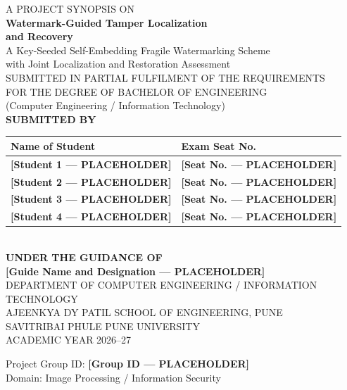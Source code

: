 \documentclass[12pt,a4paper]{article}
\newcommand{\PH}[1]{\textbf{[#1 --- PLACEHOLDER]}}
\begin{document}
\begin{titlepage}
\centering
\singlespacing
\vspace*{0.15in}

{\large A PROJECT SYNOPSIS ON}\\[0.22in]

{\LARGE\bfseries Watermark-Guided Tamper Localization\\[0.08in] and Recovery}\\[0.16in]

{\normalsize A Key-Seeded Self-Embedding Fragile Watermarking Scheme\\
with Joint Localization and Restoration Assessment}\\[0.28in]

{\normalsize SUBMITTED IN PARTIAL FULFILMENT OF THE REQUIREMENTS\\
FOR THE DEGREE OF BACHELOR OF ENGINEERING}\\[0.06in]
{\normalsize (Computer Engineering / Information Technology)}\\[0.28in]

{\large\bfseries SUBMITTED BY}\\[0.12in]

{\small
\begin{tabular}{@{}p{2.7in}p{1.9in}@{}}
\toprule
\textbf{Name of Student} & \textbf{Exam Seat No.} \\
\midrule
\PH{Student 1} & \PH{Seat No.} \\[0.12in]
\PH{Student 2} & \PH{Seat No.} \\[0.12in]
\PH{Student 3} & \PH{Seat No.} \\[0.12in]
\PH{Student 4} & \PH{Seat No.} \\
\bottomrule
\end{tabular}}\\[0.28in]

{\large\bfseries UNDER THE GUIDANCE OF}\\[0.1in]
{\normalsize \PH{Guide Name and Designation}}\\[0.28in]

{\normalsize DEPARTMENT OF COMPUTER ENGINEERING / INFORMATION TECHNOLOGY}\\[0.06in]
{\normalsize AJEENKYA DY PATIL SCHOOL OF ENGINEERING, PUNE}\\[0.06in]
{\normalsize SAVITRIBAI PHULE PUNE UNIVERSITY}\\[0.06in]
{\normalsize ACADEMIC YEAR 2026--27}

\vfill
{\small Project Group ID: \PH{Group ID}\\[0.04in]
Domain: Image Processing / Information Security}
\end{titlepage}
\end{document}
